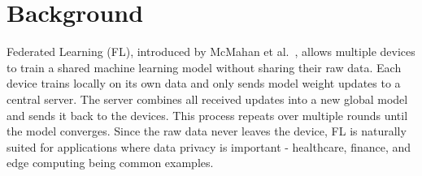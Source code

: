 \documentclass[12pt]{report}
\begin{document}
\section{Background}

Federated Learning (FL), introduced by McMahan et al.~\cite{mcmahan2017}, allows
multiple devices to train a shared machine learning model without sharing their raw
data. Each device trains locally on its own data and only sends model weight updates
to a central server. The server combines all received updates into a new global model
and sends it back to the devices. This process repeats over multiple rounds until the
model converges. Since the raw data never leaves the device, FL is naturally suited
for applications where data privacy is important - healthcare, finance, and edge
computing being common examples.
\end{document}
